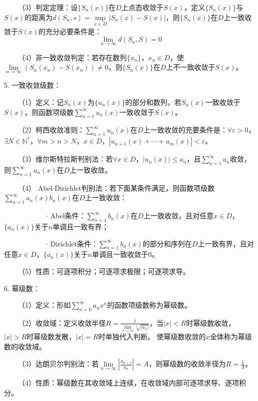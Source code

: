~~~~（3）判定定理：设$\{S_n(x)\}$在$D$上点态收敛于$S(x)$，定义$\{S_n(x)\}$与$S(x)$的距离为$d(S_n,s)=\sup\limits_{x\in D} \left|S_n(x)-S(x)\right|$，则$\{S_n(x)\}$在$D$上一致收敛于$S(x)$的充分必要条件是：
\begin{equation*}
    \lim\limits_{n\rightarrow\infty}d(S_n,S)=0
\end{equation*}

~~~~（4）非一致收敛判定：若存在数列$\{x_n\}$，$x_n\in D$，使$\lim\limits_{n\rightarrow\infty}\left(S_n(x_n)-S(x_n)\right)\neq 0$，则$\{S_n(x)\}$在$D$上不一致收敛于$S(x)$。

5. 一致收敛级数：

~~~~（1）定义：记$S_n(x)$为$\{u_n(x)\}$的部分和数列，若$S_n(x)$一致收敛于$S(x)$，则函数项级数$\sum\limits_{n=1}^{\infty} u_n(x)$一致收敛于$S(x)$。

~~~~（2）柯西收敛准则：$\sum\limits_{n=1}^{\infty} u_n(x)$在$D$上一致收敛的充要条件是：$\forall \varepsilon>0$，$\exists N \in  \mathbb{N}^*$，$\forall m>n>N$，$x\in D$，$\left|u_{n+1}(x)+\cdots+u_m(x)\right|<\varepsilon$。

~~~~（3）维尔斯特拉斯判别法：若$\forall x\in D$，$\left|u_n(x)\right|\leqslant a_n$，且$\sum\limits_{n=1}^{\infty} a_n$收敛，则$\sum\limits_{n=1}^{\infty} u_n(x)$在$D$上一致收敛。

~~~~（4） Abel-Dirichlet判别法：若下面某条件满足，则函数项级数$\sum\limits_{n=1}^\infty a_n(x)b_n(x)$在$D$上一致收敛：

~~~~~~~~~~~~$\cdot$ Abel条件：$\sum\limits_{n=1}^\infty b_n(x)$在$D$上一致收敛，且对任意$x\in D$，$\{a_n(x)\}$关于$n$单调且一致有界；

~~~~~~~~~~~~$\cdot$ Dirichlet条件：$\sum\limits_{n=1}^\infty b_n(x)$的部分和序列在$D$上一致有界，且对任意$x \in D$，$\{a_n(x)\}$关于$n$单调且一致收敛于$0$。

~~~~（5）性质：可逐项积分；可逐项求极限；可逐项求导。

6. 幂级数：

~~~~（1）定义：形如$\sum\limits_{n=0}^\infty a_nx^n$的函数项级数称为幂级数。

~~~~（2）收敛域：定义收敛半径$R=\frac{1}{\lim\limits_{n\rightarrow\infty}\sqrt[n]{|a_n|}}$，当$|x|<R$时幂级数收敛，$|x|>R$时幂级数发散，$|x|=R$时单独代入判断。
使幂级数收敛的$x$全体称为幂级数的收敛域。

~~~~（3）达朗贝尔判别法：若$\lim\limits_{n\rightarrow\infty}\left|\frac{a_{n+1}}{a_n}\right|=A$，则幂级数的收敛半径为$R=\frac{1}{A}$。

~~~~（4）性质：幂级数在其收敛域上连续，在收敛域内部可逐项求导、逐项积分。

